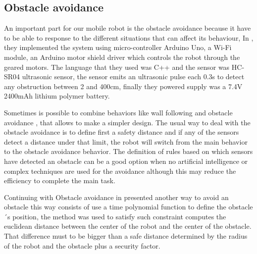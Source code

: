 \subsection{Obstacle avoidance}
An important part for our mobile robot is the obstacle avoidance because it have to be able to response to the different situations that can affect its behaviour, In \citep{azeta2019obstacle}, they implemented the system using micro-controller Arduino Uno, a Wi-Fi module, an Arduino motor shield driver which controls the robot through the geared motors. The language that they used was C++ and the sensor was HC-SR04 ultrasonic sensor, the sensor emits an ultrasonic pulse each 0.3s to detect any obstruction between 2 and 400cm, finally they powered supply was a 7.4V 2400mAh lithium polymer battery.

Sometimes is possible to combine behaviors like wall following and obstacle avoidance \citep{hacene2019fuzzy}, that allows to make a simpler design. The usual way to deal with the obstacle avoidance is to define first a safety distance and if any of the sensors detect a distance under that limit, the robot will switch from the main behavior to the obstacle avoidance behavior. The definition of rules based on which sensors have detected an obstacle \citep{tzou2009high} \citep{hacene2019fuzzy} can be a good option when no artificial intelligence or complex techniques are used for the avoidance although this may reduce the efficiency to complete the main task.

Continuing with Obstacle avoidance in \citep{arcos2019optimal} presented another way to avoid an obstacle this way consists of use a time polynomial function to define the obstacle´s position, the method was used to satisfy such constraint computes the euclidean distance between the center of the robot and the center of the obstacle. That difference must to be bigger than a safe distance determined by the radius of the robot and the obstacle plus a security factor.

